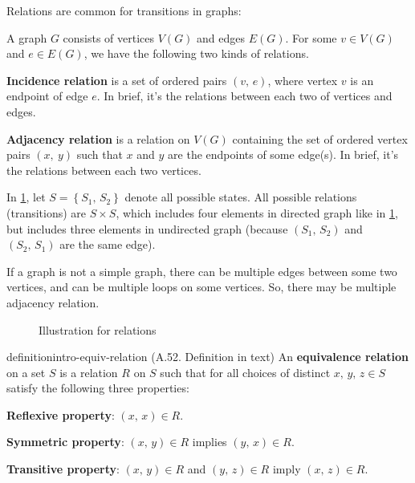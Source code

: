 \documentclass[../src/handouts/main.tex]{subfiles}
\begin{document}
Relations are common for transitions in graphs:
\begin{enumerate*}
  \item A graph $G$ consists of vertices $V(G)$ and edges $E(G)$. For some $v \in V(G)$ and $e \in E(G)$, we have the following two kinds of relations.
  \item \textbf{Incidence relation} is a set of ordered pairs $(v,\, e)$, where vertex $v$ is an endpoint of edge $e$. In brief, it's the relations between each two of vertices and edges.
  \item \textbf{Adjacency relation} is a relation on $V(G)$ containing the set of ordered vertex pairs $(x,\ y)$ such that $x$ and $y$ are the endpoints of some edge(s). In brief, it's the relations between each two vertices.
  \item In \cref{fig:intro-relation}, let $S = \left\{ S_1,\, S_2 \right\}$ denote all possible states. All possible relations (transitions) are $S \times S$, which includes four elements in directed graph like in \cref{fig:intro-relation}, but includes three elements in undirected graph (because $(S_1,\, S_2)$ and $(S_2,\, S_1)$ are the same edge).
  \item If a graph is not a simple graph, there can be multiple edges between some two vertices, and can be multiple loops on some vertices. So, there may be multiple adjacency relation.
\end{enumerate*}

\begin{figure}[ht]
  \centering
  \caption{Illustration for relations}
  \label{fig:intro-relation}
\end{figure}

\begin{recallable}{definition}{}{intro-equiv-relation}
  (A.52. Definition in text)
  An \textbf{equivalence relation} on a set $S$ is a relation $R$ on $S$ such that for all choices of distinct $x,\, y,\,z \in S$ satisfy the following three properties:
  \begin{enumerate*}
    \item \textbf{Reflexive property}: $(x,\, x) \in R$.
    \item \textbf{Symmetric property}: $(x,\, y) \in R$ implies $(y,\, x) \in R$.
    \item \textbf{Transitive property}: $(x,\, y) \in R$ and $(y,\, z) \in R$ imply $(x,\, z) \in R$.
  \end{enumerate*}
\end{recallable}
\end{document}
